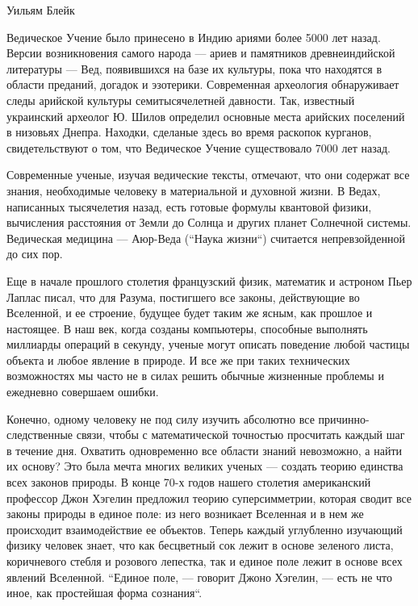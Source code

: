  {Уильям Блейк}


Ведическое Учение было принесено в Индию ариями более 5000 лет назад. Версии возникновения самого народа --- ариев и памятников древнеиндийской литературы --- Вед, появившихся на базе их культуры, пока что находятся в области преданий, догадок и эзотерики. Современная археология обнаруживает следы арийской культуры семитысячелетней давности. Так, известный украинский археолог Ю. Шилов определил основные места арийских поселений в низовьях Днепра. Находки, сделаные здесь во время раскопок курганов, свидетельствуют о том, что Ведическое Учение существовало 7000 лет назад.

Современные ученые, изучая ведические тексты, отмечают, что они содержат все знания, необходимые человеку в материальной и духовной жизни. В Ведах, написанных тысячелетия назад, есть готовые формулы квантовой физики, вычисления расстояния от Земли до Солнца и других планет Солнечной системы. Ведическая медицина --- Аюр-Веда (``Наука жизни``) считается непревзойденной до сих пор.

Еще в начале прошлого столетия французский физик, математик и астроном Пьер Лаплас писал, что для Разума, постигшего все законы, действующие во Вселенной, и ее строение, будущее будет таким же ясным, как прошлое и настоящее. В наш век, когда созданы компьютеры, способные выполнять миллиарды операций в секунду, ученые могут описать поведение любой частицы объекта и любое явление в природе. И все же при таких технических возможностях мы часто не в силах решить обычные жизненные проблемы и ежедневно совершаем ошибки.

Конечно, одному человеку не под силу изучить абсолютно все причинно-следственные связи, чтобы с математической точностью просчитать каждый шаг в течение дня. Охватить одновременно все области знаний невозможно, а найти их основу? Это была мечта многих великих ученых --- создать теорию единства всех законов природы. В конце 70-х годов нашего столетия американский профессор Джон Хэгелин предложил теорию суперсимметрии, которая сводит все законы природы в единое поле: из него возникает Вселенная и в нем же происходит взаимодействие ее объектов. Теперь каждый углубленно изучающий физику человек знает, что как бесцветный сок лежит в основе зеленого листа, коричневого стебля и розового лепестка, так и единое поле лежит в основе всех явлений Вселенной. ``Единое поле, --- говорит Джоно Хэгелин, --- есть не что иное, как простейшая форма сознания``.

